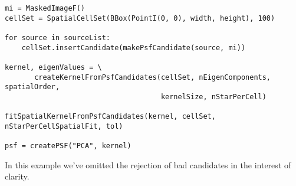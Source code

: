 \begin{center}
  \begin{minipage}{13cm}
    \small
\begin{verbatim}
mi = MaskedImageF()
cellSet = SpatialCellSet(BBox(PointI(0, 0), width, height), 100)

for source in sourceList:
    cellSet.insertCandidate(makePsfCandidate(source, mi))

kernel, eigenValues = \
       createKernelFromPsfCandidates(cellSet, nEigenComponents, spatialOrder,
                                     kernelSize, nStarPerCell)

fitSpatialKernelFromPsfCandidates(kernel, cellSet, nStarPerCellSpatialFit, tol)

psf = createPSF("PCA", kernel)
\end{verbatim}
  \end{minipage}
\end{center}
In this example we've omitted the rejection of bad candidates in the interest of clarity.
